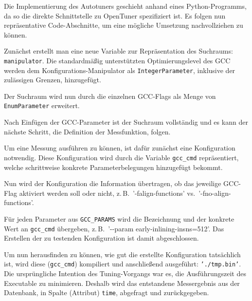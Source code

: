 \documentclass[a4paper,11pt]{scrartcl}
\newcommand{\zB}{\mbox{z.\,B.}\xspace}
\newcommand{\vs}{\mbox{vs.}\xspace}
\begin{document}
Die Implementierung des Autotuners geschieht anhand eines Python-Programms, da so die direkte Schnittstelle
zu OpenTuner spezifiziert ist. Es folgen nun repräsentative Code-Abschnitte, um eine
mögliche Umsetzung nachvollziehen zu können.  \newline


Zunächst erstellt man eine neue Variable zur Repräsentation des Suchraums: \texttt{manipulator}.
Die standardmäßig unterstützten Optimierungslevel des GCC werden dem Konfigurations-Manipulator
als \texttt{IntegerParameter}, inklusive der zulässigen Grenzen, hinzugefügt. \newline


Der Suchraum wird nun durch die einzelnen GCC-Flags als Menge von \texttt{EnumParameter} 
erweitert. \newline


Nach Einfügen der GCC-Parameter ist der Suchraum vollständig und es kann der nächste Schritt,
die Definition der Messfunktion, folgen. \newline


Um eine Messung ausführen zu können, ist dafür zunächst eine Konfiguration notwendig.
Diese Konfiguration wird durch die Variable \texttt{gcc\_cmd} repräsentiert, welche
schrittweise konkrete Parameterbelegungen hinzugefügt bekommt. \newline


Nun wird der Konfiguration die Information übertragen, ob das jeweilige GCC-Flag
aktiviert werden soll oder nicht, \zB~'-falign-functions' \vs~'-fno-align-functions'.


Für jeden Parameter aus \texttt{GCC\_PARAMS} wird die Bezeichnung und der
konkrete Wert an \texttt{gcc\_cmd} übergeben, \zB~'-{}-param early-inlining-insns=512'.
Das Erstellen der zu testenden Konfiguration ist damit abgeschlossen. \newline


Um nun herausfinden zu können, wie gut die erstellte Konfiguration tatsächlich ist, 
wird diese (\texttt{gcc\_cmd}) kompiliert und anschließend ausgeführt: \texttt{'./tmp.bin'}.
Die ursprüngliche Intention des Tuning-Vorgangs war es, die Ausführungszeit des 
Executable zu minimieren. Deshalb wird das entstandene Messergebnis aus der Datenbank,
in Spalte (Attribut) \texttt{time}, abgefragt und zurückgegeben. \newline
\end{document}

